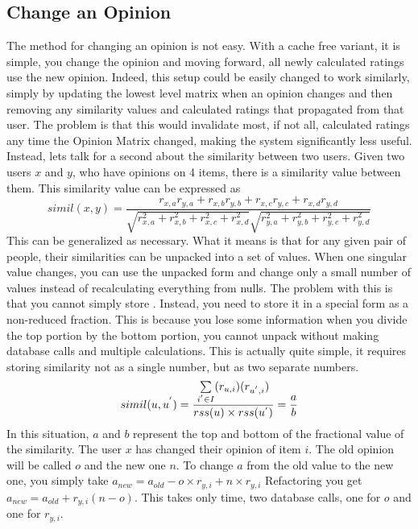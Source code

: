 \documentclass[12pt]{article}
\begin{document}
  \subsection{Change an Opinion}
  \indent\indent  The method for changing an opinion is not easy.  With a cache free variant, it is simple, you change the opinion and moving forward, all newly calculated ratings use the new opinion.  Indeed, this setup could be easily changed to work similarly, simply by updating the lowest level matrix when an opinion changes and then removing any similarity values and calculated ratings that propagated from that user.  The problem is that this would invalidate most, if not all, calculated ratings any time the Opinion Matrix changed, making the system significantly less useful.
  \p Instead, lets talk for a second about the similarity between two users.  Given two users $x$ and $y$, who have opinions on 4 items, there is a similarity value between them.  This similarity value can be expressed as
  \begin{displaymath}
    simil(x, y) = \frac{r_{x, a}r_{y, a} + r_{x, b}r_{y, b} + r_{x, c}r_{y, c} + r_{x, d}r_{y, d}}{
      \sqrt{r_{x, a}^2+r_{x, b}^2+r_{x, c}^2+r_{x, d}^2}
      \sqrt{r_{y, a}^2+r_{y, b}^2+r_{y, c}^2+r_{y, d}^2}
    }
  \end{displaymath}
  \p This can be generalized as necessary.  What it means is that for any given pair of people, their similarities can be unpacked into a set of values.  When one singular value changes, you can use the unpacked form and change only a small number of values instead of recalculating everything from nulls.
  \p The problem with this is that you cannot simply store \similarity.  Instead, you need to store it in a special form as a non-reduced fraction.  This is because you lose some information when you divide the top portion by the bottom portion, you cannot unpack without making database calls and multiple calculations.  This is actually quite simple, it requires storing similarity not as a single number, but as two separate numbers.
  \begin{displaymath}
    simil(u, u^{'}) = \frac{\sum \limits_{i^{'} \in I} (r_{u, i}) (r_{u^{'}, i})}{rss(u) \times rss(u^{'})} = \frac{a}{b}
  \end{displaymath}
  \p In this situation, $a$ and $b$ represent the top and bottom of the fractional value of the similarity.  The user $x$ has changed their opinion of item $i$.  The old opinion will be called $o$ and the new one $n$.  To change $a$ from the old value to the new one, you simply take $a_{new} = a_{old} - o\times r_{y, i} + n\times r_{y, i}$  Refactoring you get $a_{new} = a_{old} + r_{y, i}(n - o)$.  This takes only  time, two database calls, one for $o$ and one for $r_{y, i}$.  
\end{document}
